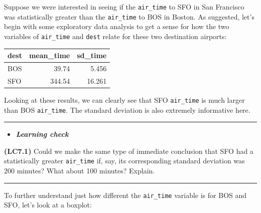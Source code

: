 \documentclass[]{tufte-book}
\newenvironment{Shaded}{\begin{snugshade}}{\end{snugshade}}
\newcommand{\KeywordTok}[1]{\textcolor[rgb]{0.13,0.29,0.53}{\textbf{{#1}}}}
\newcommand{\DataTypeTok}[1]{\textcolor[rgb]{0.13,0.29,0.53}{{#1}}}
\newcommand{\StringTok}[1]{\textcolor[rgb]{0.31,0.60,0.02}{{#1}}}
\newcommand{\NormalTok}[1]{{#1}}
\let\oldrule=\rule
\renewcommand{\rule}[1]{\oldrule{\linewidth}}
\newenvironment{rmdblock}[1]
  {\begin{shaded*}
  \begin{itemize}
  \renewcommand{\labelitemi}{
    \raisebox{-.7\height}[0pt][0pt]{
    }
  }
  \item
  }
  {
  \end{itemize}
  \end{shaded*}
  }
\newenvironment{learncheck}
  {\begin{rmdblock}{warning}}
  {\end{rmdblock}}
\begin{document}
Suppose we were interested in seeing if the \texttt{air\_time} to SFO in
San Francisco was statistically greater than the \texttt{air\_time} to
BOS in Boston. As suggested, let's begin with some exploratory data
analysis to get a sense for how the two variables of \texttt{air\_time}
and \texttt{dest} relate for these two destination airports:

\begin{Shaded}
\end{Shaded}

\begin{tabular}{l|r|r}
\hline
dest & mean\_time & sd\_time\\
\hline
BOS & 39.74 & 5.456\\
\hline
SFO & 344.54 & 16.261\\
\hline
\end{tabular}

Looking at these results, we can clearly see that SFO \texttt{air\_time}
is much larger than BOS \texttt{air\_time}. The standard deviation is
also extremely informative here.

\begin{center}\rule{0.5\linewidth}{\linethickness}\end{center}

\begin{learncheck}
\textbf{\emph{Learning check}}
\end{learncheck}

\textbf{(LC7.1)} Could we make the same type of immediate conclusion
that SFO had a statistically greater \texttt{air\_time} if, say, its
corresponding standard deviation was 200 minutes? What about 100
minutes? Explain.

\begin{center}\rule{0.5\linewidth}{\linethickness}\end{center}

To further understand just how different the \texttt{air\_time} variable
is for BOS and SFO, let's look at a boxplot:
\end{document}
